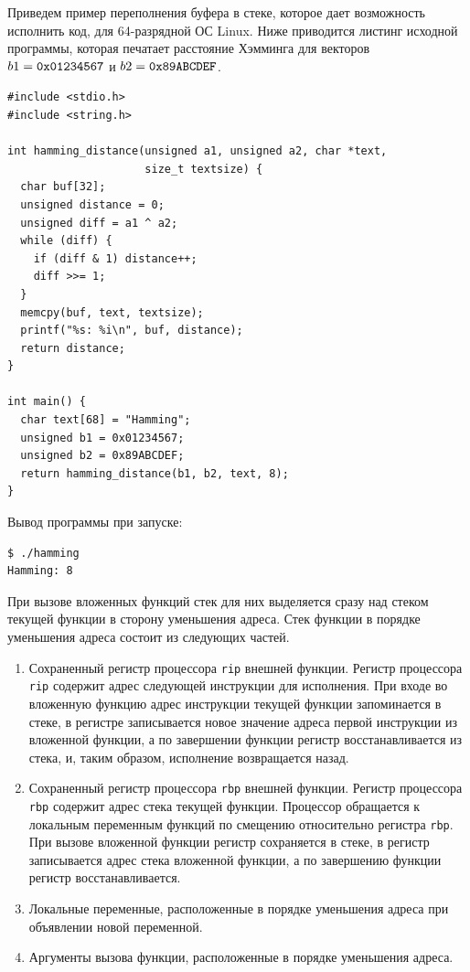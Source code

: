 Приведем пример переполнения буфера в стеке, которое дает возможность исполнить код, для 64-разрядной ОС Linux. Ниже приводится листинг исходной программы, которая печатает расстояние Хэмминга для векторов $b1 = \text{\texttt{0x01234567}}$ и $b2 = \text{\texttt{0x89ABCDEF}}$.

\begin{verbatim}
#include <stdio.h>
#include <string.h>

int hamming_distance(unsigned a1, unsigned a2, char *text,
                     size_t textsize) {
  char buf[32];
  unsigned distance = 0;
  unsigned diff = a1 ^ a2;
  while (diff) {
    if (diff & 1) distance++;
    diff >>= 1;
  }
  memcpy(buf, text, textsize);
  printf("%s: %i\n", buf, distance);
  return distance;
}

int main() {
  char text[68] = "Hamming";
  unsigned b1 = 0x01234567;
  unsigned b2 = 0x89ABCDEF;
  return hamming_distance(b1, b2, text, 8);
}
\end{verbatim}

Вывод программы при запуске:
\begin{verbatim}
$ ./hamming
Hamming: 8
\end{verbatim}

При вызове вложенных функций стек для них выделяется сразу над стеком текущей функции в сторону уменьшения адреса. Стек функции в порядке уменьшения адреса состоит из следующих частей.
\begin{enumerate}
    \item Сохраненный регистр процессора \texttt{rip} внешней функции. Регистр процессора \texttt{rip} содержит адрес следующей инструкции для исполнения. При входе во вложенную функцию адрес инструкции текущей функции запоминается в стеке, в регистре записывается новое значение адреса первой инструкции из вложенной функции, а по завершении функции регистр восстанавливается из стека, и, таким образом, исполнение возвращается назад.
    \item Сохраненный регистр процессора \texttt{rbp} внешней функции. Регистр процессора \texttt{rbp} содержит адрес стека текущей функции. Процессор обращается к локальным переменным функций по смещению относительно регистра \texttt{rbp}. При вызове вложенной функции регистр сохраняется в стеке, в регистр записывается адрес стека вложенной функции, а по завершению функции регистр восстанавливается.
    \item Локальные переменные, расположенные в порядке уменьшения адреса при объявлении новой переменной.
    \item Аргументы вызова функции, расположенные в порядке уменьшения адреса.
\end{enumerate}

